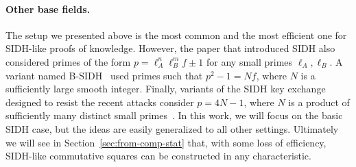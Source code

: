 \paragraph{Other base fields.}
The setup we presented above is the most common and the most efficient one for SIDH-like proofs of knowledge.
However, the paper that introduced SIDH also considered primes of the form $p = \ell_A^n \ell_B^m f \pm 1$ for any small primes $\ell_A,\ell_B$.
A variant named B-SIDH~\cite{10.1007/978-3-030-64834-3_15} used primes such that $p^2 - 1 = Nf$, where $N$ is a sufficiently large smooth integer.
Finally, variants of the SIDH key exchange designed to resist the recent attacks consider $p = 4N - 1$, where $N$ is a product of sufficiently many distinct small primes~\cite{cryptoeprint:2023/013}.
In this work, we will focus on the basic SIDH case, but the ideas are easily generalized to all other settings.
Ultimately we will see in Section~\ref{sec:from-comp-stat} that, with some loss of efficiency, SIDH-like commutative squares can be constructed in any characteristic.

